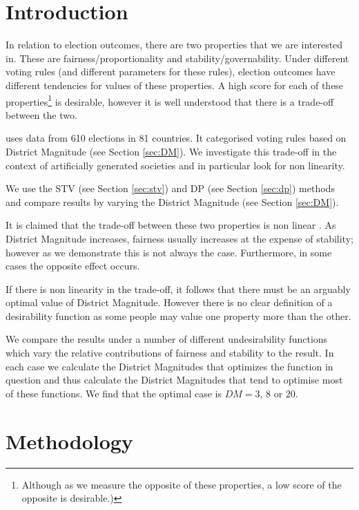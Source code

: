 \documentclass{article}
\begin{document}
\newpage
\section{Introduction}
In relation to election outcomes, there are two properties that we are interested in. These are fairness/proportionality and stability/governability. Under different voting rules (and different parameters for these rules), election outcomes have different tendencies for values of these properties. A high score for each of these properties\footnote{Although as we measure the opposite of these properties, a low score of the opposite is desirable.)} is desirable, however it is well understood that there is a trade-off between the two.

\cite{sweetspot} uses data from 610 elections in 81 countries. It categorised voting rules based on District Magnitude (see Section \ref{sec:DM}). We investigate this trade-off in the context of artificially generated societies and in particular look for non linearity.

We use the STV (see Section \ref{sec:stv}) and DP (see Section \ref{sec:dp}) methods and compare results by varying the District Magnitude (see Section \ref{sec:DM}).

It is claimed that the trade-off between these two properties is non linear \cite{sweetspot}. As District Magnitude increases, fairness usually increases at the expense of stability; however as we demonstrate this is not always the case. Furthermore, in some cases the opposite effect occurs. %

If there is non linearity in the trade-off, it follows that there must be an arguably optimal value of District Magnitude. However there is no clear definition of a desirability function as some people may value one property more than the other.

We compare the results under a number of different undesirability functions which vary the relative contributions of fairness and stability to the result. In each case we calculate the District Magnitudes that optimizes the function in question and thus calculate the District Magnitudes that tend to optimise most of these functions. We find that the optimal case is $DM=3$, $8$ or $20$.

\section{Methodology}
\end{document}
